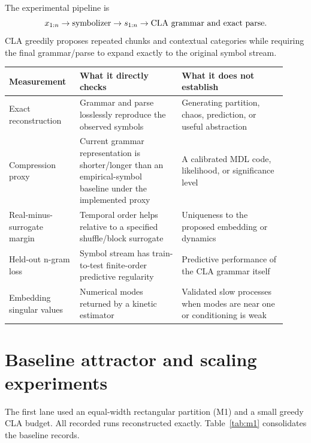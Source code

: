 \documentclass[11pt]{article}
\begin{document}
The experimental pipeline is
\[
  x_{1:n} \rightarrow \hbox{symbolizer} \rightarrow s_{1:n}
  \rightarrow \hbox{CLA grammar and exact parse}.
\]
CLA greedily proposes repeated chunks and contextual categories while requiring
the final grammar/parse to expand exactly to the original symbol stream.

\begin{longtable}{p{0.23\linewidth}p{0.34\linewidth}p{0.35\linewidth}}
\toprule
Measurement & What it directly checks & What it does not establish \\
\midrule
\endhead
Exact reconstruction & Grammar and parse losslessly reproduce the observed
symbols & Generating partition, chaos, prediction, or useful abstraction \\
Compression proxy & Current grammar representation is shorter/longer than an
empirical-symbol baseline under the implemented proxy & A calibrated MDL code,
likelihood, or significance level \\
Real-minus-surrogate margin & Temporal order helps relative to a specified
shuffle/block surrogate & Uniqueness to the proposed embedding or dynamics \\
Held-out n-gram loss & Symbol stream has train-to-test finite-order predictive
regularity & Predictive performance of the CLA grammar itself \\
Embedding singular values & Numerical modes returned by a kinetic estimator &
Validated slow processes when modes are near one or conditioning is weak \\
\bottomrule
\end{longtable}

\section{Baseline attractor and scaling experiments}

The first lane used an equal-width rectangular partition (M1) and a small greedy
CLA budget. All recorded runs reconstructed exactly. Table~\ref{tab:m1}
consolidates the baseline records.
\end{document}
